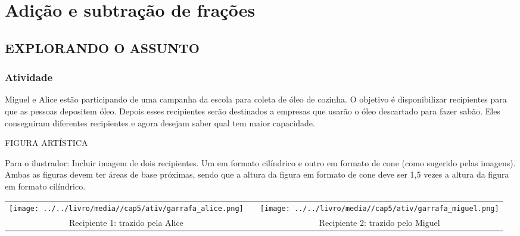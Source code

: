 \documentclass[a4,12pt]{book}
\begin{document}
\chapter{Adição e subtração de frações }
\setcounter{subsection}{0}

\section{EXPLORANDO O ASSUNTO }

\subsection{Atividade}


Miguel e Alice estão participando de uma campanha da escola para coleta de óleo de cozinha. O objetivo é disponibilizar recipientes para que as pessoas depositem óleo. Depois esses recipientes serão destinados a empresas que usarão o óleo descartado para fazer sabão. Eles conseguiram diferentes recipientes e agora desejam saber qual tem maior capacidade.

\begin{imagem*}[breakable]{}{}  

FIGURA ARTÍSTICA

Para o ilustrador: Incluir imagem de dois recipientes. Um em formato cilíndrico e outro em formato de cone (como sugerido pelas imagens). Ambas as figuras devem ter áreas de base próximas, sendo que a altura da figura em formato de cone deve ser 1,5 vezes a altura da figura em formato cilíndrico.

\begin{tabular}{ccc}
\texttt{[image: ../../livro/media//cap5/ativ/garrafa\_alice.png]} &\quad \quad&  \texttt{[image: ../../livro/media//cap5/ativ/garrafa\_miguel.png]}\\
Recipiente 1: trazido pela Alice & &Recipiente 2: trazido pelo Miguel 
\end{tabular} 
\end{imagem*}
\end{document}
